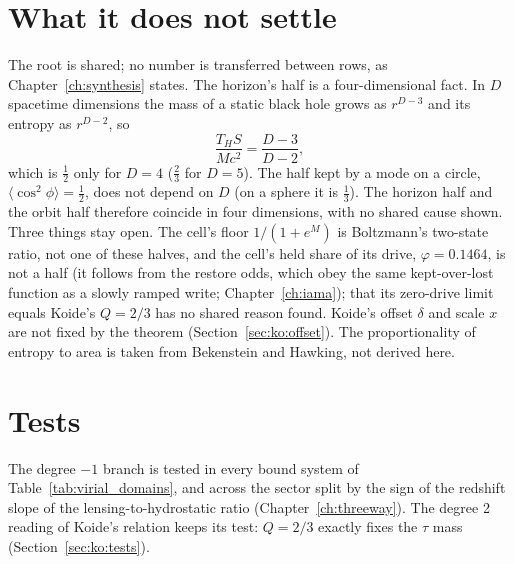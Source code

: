 \section{What it does not settle}\label{sec:eh_open}
The root is shared; no number is transferred between rows, as Chapter~\ref{ch:synthesis} states. \interp{} The horizon's half is a
four-dimensional fact. In $D$ spacetime dimensions the mass of a static black hole grows as $r^{D-3}$ and its entropy as $r^{D-2}$, so
\begin{equation}
\frac{T_HS}{Mc^2}=\frac{D-3}{D-2},\label{eq:eh_smarrD}
\end{equation}
which is $\tfrac12$ only for $D=4$ ($\tfrac23$ for $D=5$). \derived{} The half kept by a mode on a circle, $\langle\cos^2\phi\rangle=\tfrac12$, does not
depend on $D$ (on a sphere it is $\tfrac13$). The horizon half and the orbit half therefore coincide in four dimensions, with no shared cause shown.
\derived{} Three things stay open. The cell's floor
$1/(1+e^M)$ is Boltzmann's two-state ratio, not one of these halves, and the cell's held share of its drive, $\varphi=0.1464$, is not a half (it follows from the restore odds, which obey the same kept-over-lost function as a slowly ramped write; Chapter~\ref{ch:iama}); that its
zero-drive limit equals Koide's $Q=2/3$ has no shared reason found. \openprob{} Koide's offset $\delta$ and scale $x$ are not fixed by the
theorem (Section~\ref{sec:ko:offset}). \openprob{} The proportionality of entropy to area is taken from Bekenstein and Hawking, not derived here.
\openprob

\section{Tests}\label{sec:eh_tests}
The degree $-1$ branch is tested in every bound system of Table~\ref{tab:virial_domains}, and across the sector split by the sign of the redshift
slope of the lensing-to-hydrostatic ratio (Chapter~\ref{ch:threeway}). \prediction{} The degree 2 reading of Koide's relation keeps its test:
$Q=2/3$ exactly fixes the $\tau$ mass (Section~\ref{sec:ko:tests}). \prediction

